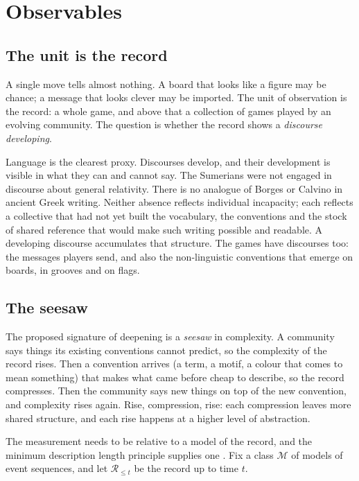 \documentclass[11pt,a4paper]{article}
\newcommand{\Rec}{\mathcal{R}}
\newcommand{\Mod}{\mathcal{M}}
\begin{document}
\section{Observables}\label{sec:observables}

\subsection{The unit is the record}

A single move tells almost nothing. A board that looks like a figure may be chance; a message that
looks clever may be imported. The unit of observation is the record: a whole game, and above that
a collection of games played by an evolving community. The question is whether the record shows a
\emph{discourse developing}.

Language is the clearest proxy. Discourses develop, and their development is visible in what they
can and cannot say. The Sumerians were not engaged in discourse about general relativity. There is
no analogue of Borges or Calvino in ancient Greek writing. Neither absence reflects individual
incapacity; each reflects a collective that had not yet built the vocabulary, the conventions and
the stock of shared reference that would make such writing possible and readable. A developing
discourse accumulates that structure. The games have discourses too: the messages players send,
and also the non-linguistic conventions that emerge on boards, in grooves and on flags.

\subsection{The seesaw}

The proposed signature of deepening is a \emph{seesaw} in complexity. A community says things its
existing conventions cannot predict, so the complexity of the record rises. Then a convention
arrives (a term, a motif, a colour that comes to mean something) that makes what came before cheap
to describe, so the record compresses. Then the community says new things on top of the new
convention, and complexity rises again. Rise, compression, rise: each compression leaves more
shared structure, and each rise happens at a higher level of abstraction.

The measurement needs to be relative to a model of the record, and the minimum description length
principle supplies one \cite{rissanen,grunwald}. Fix a class $\Mod$ of models of event sequences,
and let $\Rec_{\le t}$ be the record up to time $t$.
\end{document}
